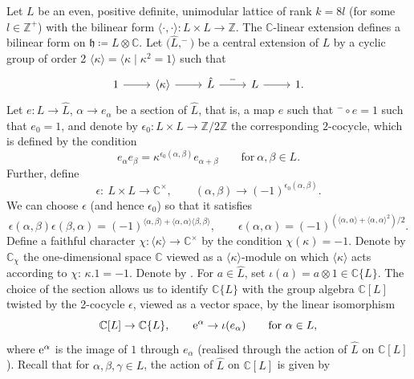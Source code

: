 \documentclass[pdftex]{sigma}
\numberwithin{equation}{section}
\theoremstyle{definition}
\begin{document}
Let $L$ be an even, positive definite, unimodular lattice of rank $k=8l$ (for some $l\in \mathbb{Z}^+$) with the bilinear form
$\langle\cdot,\cdot \rangle\colon L\times L\to \mathbb{Z}$. The $\mathbb{C}$-linear extension defines a bilinear form on $\mathfrak{h}\coloneqq L\otimes \mathbb{C}$. Let $\bigl(\hat{L},^-\bigr)$ be a central extension of $L$ by a cyclic group of order 2 $\langle \kappa\rangle=\big\langle \kappa \mid \kappa^2=1\big\rangle$
such that
\[\begin{tikzcd}
 1 \arrow[r] & \langle\kappa\rangle \arrow[r] & \hat{L} \arrow[r, "-"] & L \arrow[r] & 1.
\end{tikzcd}\]
Let
$e\colon L\to \hat{L}$, $ \alpha\to e_{\alpha}$
be a section of $\hat{L}$, that is, a map $e$ such that $^-\circ e=1$ such that
$e_0=1$,
and denote by $\epsilon_0\colon L\times L\to \mathbb{Z}/2\mathbb{Z}$
the corresponding $2$-cocycle, which is defined by the condition
\[e_{\alpha}e_{\beta}=\kappa^{\epsilon_0(\alpha,\beta)}e_{\alpha+\beta}\qquad \text{for} \ \alpha,\beta\in L.\]
Further, define
\[\epsilon\colon\ L\times L\to \mathbb{C}^{\times},\qquad
(\alpha,\beta)\to (-1)^{\epsilon_0(\alpha,\beta)}.\]
We can choose $\epsilon$ \cite{Mason2018N2N4Subalgebras} (and hence $\epsilon_0$) so that it satisfies
\[\epsilon(\alpha,\beta)\epsilon(\beta,\alpha)=(-1)^{\langle\alpha,\beta\rangle+\langle\alpha,\alpha\rangle\langle\beta,\beta\rangle},\qquad \epsilon(\alpha,\alpha)=(-1)^{(\langle\alpha,\alpha\rangle+\langle\alpha,\alpha\rangle^2)/2}.\]
Define a faithful character
$\chi\colon \langle\kappa\rangle\to \mathbb{C}^{\times}$
by the condition
$\chi(\kappa)=-1$.
Denote by $\mathbb{C}_{\chi}$ the one-dimensional space $\mathbb{C}$ viewed as a $\langle\kappa\rangle$-module on which $\langle\kappa\rangle$ acts according to $\chi$:
$\kappa.1=-1$.
Denote by . For $a\in \hat{L}$, set
$\iota(a)=a\otimes 1\in \mathbb{C}\{L\}$.
The choice of the section allows us to identify $\mathbb{C}\{L\}$ with the group algebra $\mathbb{C}[L]$ twisted by the 2-cocycle $\epsilon$, viewed as a vector space, by the linear isomorphism \cite{Lepowsky2004Vertex}
\[\mathbb{C}[L]\to \mathbb{C}\{L\},\qquad {\rm e}^{\alpha}\to \iota(e_{\alpha})\qquad \text{for}\ \alpha\in L,\]
where ${\rm e}^{\alpha}$ is the image of $1$ through $e_{\alpha}$ (realised through the action of $\hat{L}$ on $\mathbb{C}[L]$). Recall that for $\alpha,\beta, \gamma\in L$, the action of $\hat{L}$ on $\mathbb{C}[L]$ is given by
\end{document}
